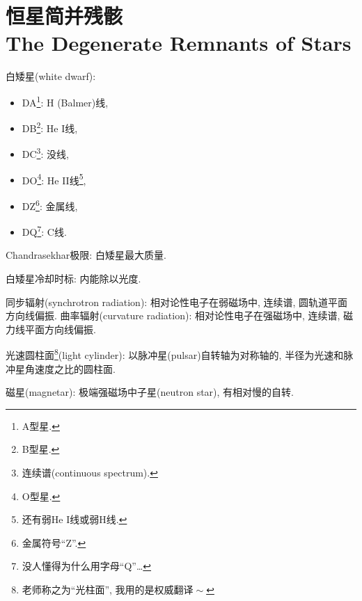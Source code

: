 \chapter{恒星简并残骸\\The Degenerate Remnants of Stars}

白矮星(white dwarf):
\begin{itemize}
    \item DA\footnote{A型星.}: H (Balmer)线,
    \item DB\footnote{B型星.}: He I线,
    \item DC\footnote{连续谱(continuous spectrum).}: 没线,
    \item DO\footnote{O型星.}: He II线\footnote{还有弱He I线或弱H线.},
    \item DZ\footnote{金属符号``Z''.}: 金属线,
    \item DQ\footnote{没人懂得为什么用字母``Q''\dots}: C线.
\end{itemize}

Chandrasekhar极限: 白矮星最大质量.

白矮星冷却时标: 内能除以光度.

同步辐射(synchrotron radiation): 相对论性电子在弱磁场中, 连续谱, 圆轨道平面方向线偏振. 曲率辐射(curvature radiation): 相对论性电子在强磁场中, 连续谱, 磁力线平面方向线偏振.

光速圆柱面\footnote{老师称之为``光柱面'', 我用的是权威翻译$\!\sim$}(light cylinder): 以脉冲星(pulsar)自转轴为对称轴的, 半径为光速和脉冲星角速度之比的圆柱面.

磁星(magnetar): 极端强磁场中子星(neutron star), 有相对慢的自转.
